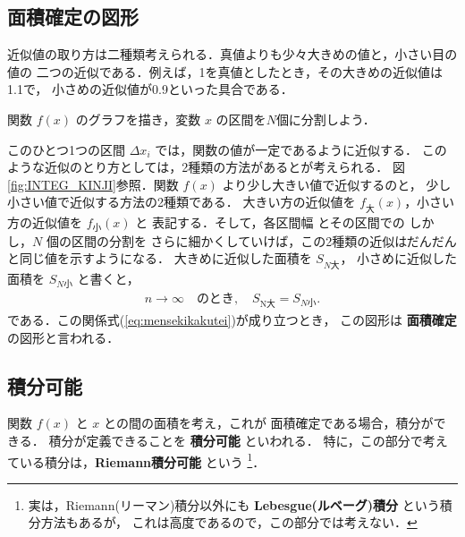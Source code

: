             \subsection{面積確定の図形}
                近似値の取り方は二種類考えられる．真値よりも少々大きめの値と，小さい目の値の
                二つの近似である．例えば，1を真値としたとき，その大きめの近似値は1.1で，
                小さめの近似値が0.9といった具合である．

                関数 $f(x)$ のグラフを描き，変数 $x$ の区間を$N$個に分割しよう．

                このひとつ1つの区間 $\Delta x_{i}$ では，関数の値が一定であるように近似する．
                このような近似のとり方としては，2種類の方法があるとが考えられる．
                図\ref{fig:INTEG_KINJI}参照．関数 $f(x)$ より少し大きい値で近似するのと，
                少し小さい値で近似する方法の2種類である．
                大きい方の近似値を $f_{\mbox{大}}(x)$，小さい方の近似値を $f_{\mbox{小}}(x)$ と
                表記する．そして，各区間幅  とその区間での
                しかし，$N$ 個の区間の分割を
                さらに細かくしていけば，この2種類の近似はだんだんと同じ値を示すようになる．
                大きめに近似した面積を $S_{N\mbox{大}}$，
                小さめに近似した面積を $S_{N\mbox{小}}$ と書くと，
                \begin{align}\label{eq:mensekikakutei}
                    n \longrightarrow \infty
                    \quad \mbox{のとき},\quad
                    S_{\mbox{N大}} = S_{N\mbox{小}}.
                \end{align}
                である．この関係式(\ref{eq:mensekikakutei})が成り立つとき，
                この図形は \textbf{面積確定} の図形と言われる．

            \subsection{積分可能}
                関数 $f(x)$ と $x$ との間の面積を考え，これが
                面積確定である場合，積分ができる．
                積分が定義できることを \textbf{積分可能} といわれる．
                特に，この部分で考えている積分は，\textbf{Riemann積分可能} という
                    \footnote{
                        実は，Riemann(リーマン)積分以外にも \textbf{Lebesgue(ルベーグ)積分} という積分方法もあるが，
                        これは高度であるので，この部分では考えない．
                    }．

